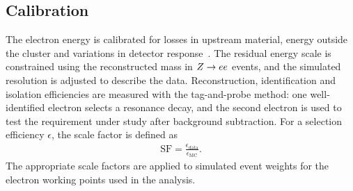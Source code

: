 \subsection{Calibration}

The electron energy is calibrated for losses in upstream material, energy outside the cluster and variations in detector response~\cite{ATLAS2019ElectronPerformance}.
The residual energy scale is constrained using the reconstructed mass in $Z\rightarrow ee$ events, and the simulated resolution is adjusted to describe the data.
Reconstruction, identification and isolation efficiencies are measured with the tag-and-probe method: one well-identified electron selects a resonance decay, and the second electron is used to test the requirement under study after background subtraction.
For a selection efficiency $\epsilon$, the scale factor is defined as
\begin{align}
    \mathrm{SF}=\frac{\epsilon_{\mathrm{data}}}{\epsilon_{\mathrm{MC}}}.
    \label{eq:ch6_efficiency_sf}
\end{align}
The appropriate scale factors are applied to simulated event weights for the electron working points used in the analysis.

